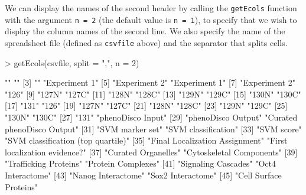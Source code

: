 We can display the names of the second header by calling the
\texttt{getEcols} function with the argument \texttt{n = 2} (the
default value is \texttt{n = 1}), to specify that we wish to display
the column names of the second line. We also specify the name of the
spreadsheet file (defined as \texttt{csvfile} above) and the
separator that splits cells.

\begin{Schunk}
\begin{Sinput}
> getEcols(csvfile, split = ",", n = 2)
\end{Sinput}
\begin{Soutput}
 [1] ""                                  ""                                 
 [3] ""                                  "Experiment 1"                     
 [5] "Experiment 2"                      "Experiment 1"                     
 [7] "Experiment 2"                      "126"                              
 [9] "127N"                              "127C"                             
[11] "128N"                              "128C"                             
[13] "129N"                              "129C"                             
[15] "130N"                              "130C"                             
[17] "131"                               "126"                              
[19] "127N"                              "127C"                             
[21] "128N"                              "128C"                             
[23] "129N"                              "129C"                             
[25] "130N"                              "130C"                             
[27] "131"                               "phenoDisco Input"                 
[29] "phenoDisco Output"                 "Curated phenoDisco Output"        
[31] "SVM marker set"                    "SVM classification"               
[33] "SVM score"                         "SVM classification (top quartile)"
[35] "Final Localization Assignment"     "First localization evidence?"     
[37] "Curated Organelles"                "Cytoskeletal Components"          
[39] "Trafficking Proteins"              "Protein Complexes"                
[41] "Signaling Cascades"                "Oct4 Interactome"                 
[43] "Nanog Interactome"                 "Sox2 Interactome"                 
[45] "Cell Surface Proteins"            
\end{Soutput}
\end{Schunk}

